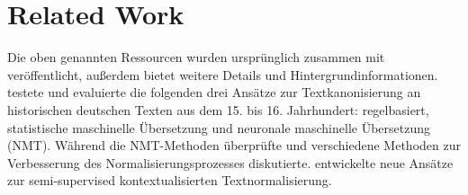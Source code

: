\documentclass{scrartcl}
\begin{document}
\section{Related Work}
Die oben genannten Ressourcen wurden ursprünglich zusammen mit \cite{bollmann-2019-large} veröffentlicht, außerdem bietet \cite{Bollmann2018} weitere Details und Hintergrundinformationen. \cite{korchagina-2017-normalizing} testete und evaluierte die folgenden drei Ansätze zur Textkanonisierung an historischen deutschen Texten aus dem 15. bis 16. Jahrhundert: regelbasiert, statistische maschinelle Übersetzung und neuronale maschinelle Übersetzung (NMT). Während \cite{hamalainen-etal-2019-revisiting} die NMT-Methoden überprüfte und verschiedene Methoden zur Verbesserung des Normalisierungsprozesses diskutierte. \cite{makarov-clematide-2020-semi} entwickelte neue Ansätze zur semi-supervised kontextualisierten Textnormalisierung.




\end{document}
